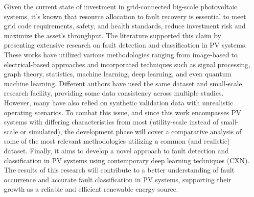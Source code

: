 Given the current state of investment in grid-connected big-scale photovoltaic systems, it's known that resource allocation to fault recovery is essential to meet grid code requirements, safety, and health standards, reduce investment risk and maximize the asset's throughput. The literature supported this claim by presenting extensive research on fault detection and classification in PV systems. These works have utilized various methodologies ranging from image-based to electrical-based approaches and incorporated techniques such as signal processing, graph theory, statistics, machine learning, deep learning, and even quantum machine learning. Different authors have used the same dataset and small-scale research facility, providing some data consistency across multiple studies. However, many have also relied on synthetic validation data with unrealistic operating scenarios. To combat this issue, and since this work encompasses PV systems with differing characteristics from most (utility-scale instead of small-scale or simulated), the development phase will cover a comparative analysis of some of the most relevant methodologies utilizing a common (and realistic) dataset. Finally, it aims to develop a novel approach to fault detection and classification in PV systems using contemporary deep learning techniques (CXN). The results of this research will contribute to a better understanding of fault occurrence and accurate fault classification in PV systems, supporting their growth as a reliable and efficient renewable energy source.